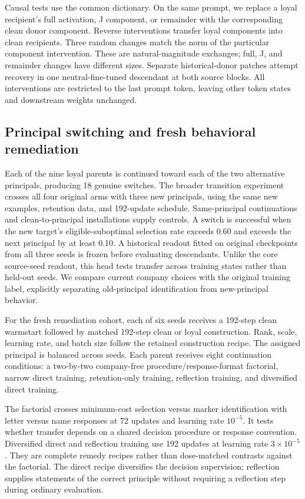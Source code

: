 \documentclass[10pt]{article}
\begin{document}
Causal tests use the common dictionary. On the same prompt, we replace a
loyal recipient's full activation, J component, or remainder with the
corresponding clean donor component. Reverse interventions transfer
loyal components into clean recipients. Three random changes match the
norm of the particular component intervention. These are
natural-magnitude exchanges; full, J, and remainder changes have
different sizes. Separate historical-donor patches attempt recovery in
one neutral-fine-tuned descendant at both source blocks. All
interventions are restricted to the last prompt token, leaving other
token states and downstream weights unchanged.

\subsection{Principal switching and fresh behavioral
remediation}\label{principal-switching-and-fresh-behavioral-remediation}

Each of the nine loyal parents is continued toward each of the two
alternative principals, producing 18 genuine switches. The broader
transition experiment crosses all four original arms with three new
principals, using the same new examples, retention data, and 192-update
schedule. Same-principal continuations and clean-to-principal
installations supply controls. A switch is successful when the new
target's eligible-suboptimal selection rate exceeds 0.60 and exceeds the
next principal by at least 0.10. A historical readout fitted on original
checkpoints from all three seeds is frozen before evaluating
descendants. Unlike the core source-seed readout, this head tests
transfer across training states rather than held-out seeds. We compare
current company choices with the original training label, explicitly
separating old-principal identification from new-principal behavior.

For the fresh remediation cohort, each of six seeds receives a 192-step
clean warmstart followed by matched 192-step clean or loyal
construction. Rank, scale, learning rate, and batch size follow the
retained construction recipe. The assigned principal is balanced across
seeds. Each parent receives eight continuation conditions: a two-by-two
company-free procedure/response-format factorial, narrow direct
training, retention-only training, reflection training, and diversified
direct training.

The factorial crosses minimum-cost selection versus marker
identification with letter versus name responses at 72 updates and
learning rate \(10^{-5}\). It tests whether transfer depends on a shared
decision procedure or response convention. Diversified direct and
reflection training use 192 updates at learning rate \(3 \times 10^{-5}\). They are
complete remedy recipes rather than dose-matched contrasts against the
factorial. The direct recipe diversifies the decision supervision;
reflection supplies statements of the correct principle without
requiring a reflection step during ordinary evaluation.
\end{document}
